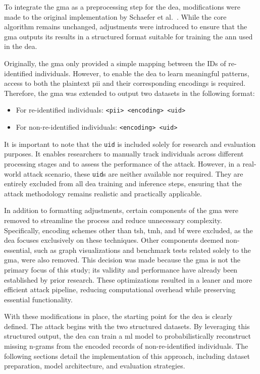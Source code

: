 To integrate the \ac{gma} as a preprocessing step for the \ac{dea}, modifications were made to the original implementation by Schaefer et al.~\cite{schaefer2024}.
While the core algorithm remains unchanged, adjustments were introduced to ensure that the \ac{gma} outputs its results in a structured format suitable for training the \ac{ann} used in the \ac{dea}.

Originally, the \ac{gma} only provided a simple mapping between the IDs of re-identified individuals.
However, to enable the \ac{dea} to learn meaningful patterns, access to both the plaintext \ac{pii} and their corresponding encodings is required.
Therefore, the \ac{gma} was extended to output two datasets in the following format:

\begin{itemize}
    \item For re-identified individuals: \texttt{<\ac{pii}> <encoding> <uid>}
    \item For non-re-identified individuals: \texttt{<encoding> <uid>}
\end{itemize}

It is important to note that the \texttt{uid} is included solely for research and evaluation purposes.
It enables researchers to manually track individuals across different processing stages and to assess the performance of the attack.
However, in a real-world attack scenario, these \texttt{uid}s are neither available nor required.
They are entirely excluded from all \ac{dea} training and inference steps, ensuring that the attack methodology remains realistic and practically applicable.

In addition to formatting adjustments, certain components of the \ac{gma} were removed to streamline the process and reduce unnecessary complexity.
Specifically, encoding schemes other than \ac{tsh}, \ac{tmh}, and \ac{bf} were excluded, as the \ac{dea} focuses exclusively on these techniques.
Other components deemed non-essential, such as graph visualizations and benchmark tests related solely to the \ac{gma},  were also removed.
This decision was made because the \ac{gma} is not the primary focus of this study; its validity and performance have already been established by prior research.
These optimizations resulted in a leaner and more efficient attack pipeline, reducing computational overhead while preserving essential functionality.

With these modifications in place, the starting point for the \ac{dea} is clearly defined.
The attack begins with the two structured datasets.
By leveraging this structured output, the \ac{dea} can train a \ac{ml} model to probabilistically reconstruct missing n-grams from the encoded records of non-re-identified individuals.
The following sections detail the implementation of this approach, including dataset preparation, model architecture, and evaluation strategies.

